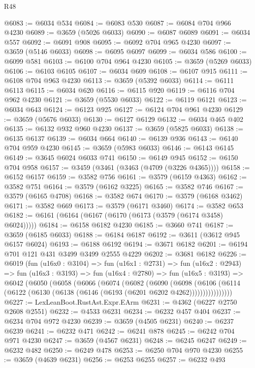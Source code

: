 \begin{lexlean}{R48}
\begin{coremodule}
@6083 := @6034 @534
@6084 := @6083 @530
@6087 := @6084 @704 @966 @4230
@6089 := @3659 (@5026 @6033)
@6090 := @6087 @6089
@6091 := @6034 @557
@6092 := @6091 @908
@6095 := @6092 @704 @965 @4230
@6097 := @3659 (@5146 @6033)
@6098 := @6095 @6097
@6099 := @6034 @586
@6100 := @6099 @581
@6103 := @6100 @704 @964 @4230
@6105 := @3659 (@5269 @6033)
@6106 := @6103 @6105
@6107 := @6034 @609
@6108 := @6107 @915
@6111 := @6108 @704 @963 @4230
@6113 := @3659 (@5392 @6033)
@6114 := @6111 @6113
@6115 := @6034 @620
@6116 := @6115 @920
@6119 := @6116 @704 @962 @4230
@6121 := @3659 (@5530 @6033)
@6122 := @6119 @6121
@6123 := @6034 @643
@6124 := @6123 @925
@6127 := @6124 @704 @961 @4230
@6129 := @3659 (@5676 @6033)
@6130 := @6127 @6129
@6132 := @6034 @465 @402
@6135 := @6132 @932 @960 @4230
@6137 := @3659 (@5825 @6033)
@6138 := @6135 @6137
@6139 := @6034 @664
@6140 := @6139 @936
@6143 := @6140 @704 @959 @4230
@6145 := @3659 (@5983 @6033)
@6146 := @6143 @6145
@6149 := @3645 @6024 @6033 @741
@6150 := @6149 @945
@6152 := @6150 @704 @958
@6157 := @3459 (@3461 (@3463 (@4709 (@3226 @4365))))
@6158 := @6152 @6157
@6159 := @3582 @756
@6161 := @3579 (@6159 @4363)
@6162 := @3582 @751
@6164 := @3579 (@6162 @3225)
@6165 := @3582 @746
@6167 := @3579 (@6165 @4708)
@6168 := @3582 @674
@6170 := @3579 (@6168 @3462)
@6171 := @3582 @669
@6173 := @3579 (@6171 @3460)
@6174 := @3582 @653
@6182 := @6161 (@6164 (@6167 (@6170 (@6173 (@3579 (@6174 @3458) @6024)))))
@6184 := @6158 @6182 @4230
@6185 := @3660 @741
@6187 := @3659 (@6185 @6033)
@6188 := @6184 @6187
@6192 := @3611 (@3612 @945 @6157 @6024)
@6193 := @6188 @6192
@6194 := @3671 @6182
@6201 := @6194 @701 @121 @431 @3499 @3499 @2555 @4229
@6202 := @3681 @6182
@6226 := @6019
    (fun (u16x0 : @3104) =>
    fun (u16x1 : @2731) =>
    fun (u16x2 : @2943) =>
    fun (u16x3 : @3193) =>
    fun (u16x4 : @2780) =>
    fun (u16x5 : @3193) =>
    @6042
      (@6050
        (@6058
          (@6066
            (@6074
              (@6082
                (@6090
                  (@6098
                    (@6106
                      (@6114 (@6122 (@6130 (@6138 (@6146 (@6193 (@6201 @6202 @4262))))))))))))))))
@6227 := LexLeanBoot.RustAst.Expr.EArm
@6231 := @4362 (@6227 @2750 @2608 @2551)
@6232 := @4533 @6231
@6234 := @6232 @457 @404
@6237 := @6234 @704 @972 @4230
@6239 := @3659 (@4505 @6231)
@6240 := @6237 @6239
@6241 := @6232 @471
@6242 := @6241 @878
@6245 := @6242 @704 @971 @4230
@6247 := @3659 (@4567 @6231)
@6248 := @6245 @6247
@6249 := @6232 @482
@6250 := @6249 @478
@6253 := @6250 @704 @970 @4230
@6255 := @3659 (@4639 @6231)
@6256 := @6253 @6255
@6257 := @6232 @493

\end{coremodule}
\end{lexlean}

